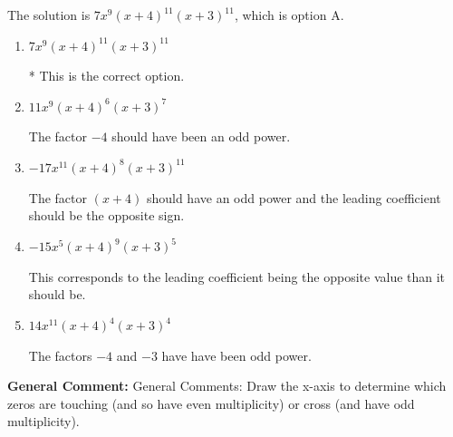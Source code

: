 \documentclass{extbook}[14pt]
\begin{document}
\begin{enumerate}
{The solution is \( 7x^{9} (x + 4)^{11} (x + 3)^{11} \), which is option A.\begin{enumerate}[label=\Alph*.]
\item \( 7x^{9} (x + 4)^{11} (x + 3)^{11} \)

* This is the correct option.
\item \( 11x^{9} (x + 4)^{6} (x + 3)^{7} \)

The factor $-4$ should have been an odd power.
\item \( -17x^{11} (x + 4)^{8} (x + 3)^{11} \)

The factor $(x + 4)$ should have an odd power and the leading coefficient should be the opposite sign.
\item \( -15x^{5} (x + 4)^{9} (x + 3)^{5} \)

This corresponds to the leading coefficient being the opposite value than it should be.
\item \( 14x^{11} (x + 4)^{4} (x + 3)^{4} \)

The factors $-4$ and $-3$ have have been odd power.
\end{enumerate}

\textbf{General Comment:} General Comments: Draw the x-axis to determine which zeros are touching (and so have even multiplicity) or cross (and have odd multiplicity).
}
\end{enumerate}
\end{document}
